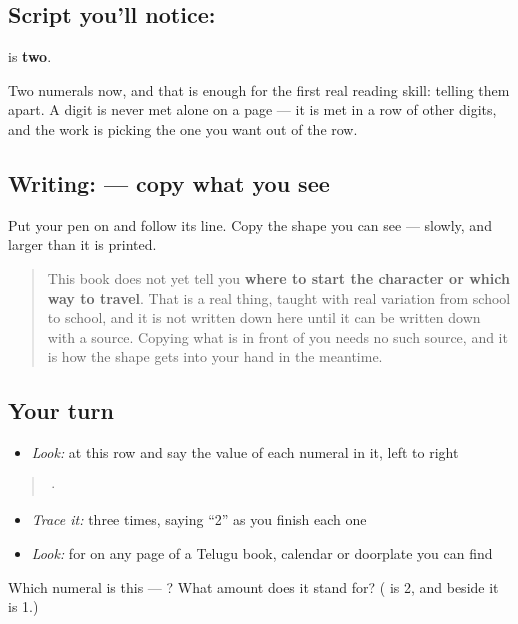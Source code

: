 \subsection*{Script you'll notice: }
\textbf{} is \textbf{two}.

Two numerals now, and that is enough for the first real reading skill: telling them apart. A digit is never met alone on a page — it is met in a row of other digits, and the work is picking the one you want out of the row.

\subsection*{Writing:  — copy what you see}
Put your pen on  and follow its line. Copy the shape you can see — slowly, and larger than it is printed.

\begin{quote}
This book does not yet tell you \textbf{where to start the character or which way to travel}. That is a real thing, taught with real variation from school to school, and it is not written down here until it can be written down with a source. Copying what is in front of you needs no such source, and it is how the shape gets into your hand in the meantime.
\end{quote}

\subsection*{Your turn}
\begin{itemize}
\raggedright
  \item \emph{Look:} at this row and say the value of each numeral in it, left to right
\end{itemize}

\begin{quote}
  ·  
\end{quote}

\begin{itemize}
\raggedright
  \item \emph{Trace it:}  three times, saying \textquotedblleft{}2\textquotedblright{} as you finish each one
  \item \emph{Look:} for  on any page of a Telugu book, calendar or doorplate you can find
\end{itemize}

\begin{tcolorbox}[breakable,colback=teal!4,colframe=teal!35!black,title={Before you move on}]
Which numeral is this — ? What amount does it stand for? ( is 2, and  beside it is 1.)
\end{tcolorbox}
